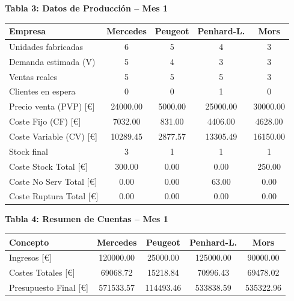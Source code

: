 \documentclass{standalone}
\begin{document}
	\vspace{4em} %
	
	\begin{minipage}{1.08\linewidth}
		\centering
		
		\textbf{Tabla 3: Datos de Producción – Mes 1}\\[0.5em]
		\begin{tabular}{@{}l
				S[table-format=2.0]
				S[table-format=2.0]
				S[table-format=2.0]
				S[table-format=2.0]@{}}
			\toprule
			\textbf{Empresa} & \textbf{Mercedes} & \textbf{Peugeot} & \textbf{Penhard-L.} & \textbf{Mors} \\
			\midrule
			Unidades fabricadas & 6 & 5 & 4 & 3 \\
			Demanda estimada (V) & 5 & 4 & 3 & 3 \\
			Ventas reales & 5 & 5 & 5 & 3 \\
			Clientes en espera & 0 & 0 & 1 & 0 \\
			Precio venta (PVP) [\euro] & 24000.00 & 5000.00 & 25000.00 & 30000.00 \\
			Coste Fijo (CF) [\euro] & 7032.00 & 831.00 & 4406.00 & 4628.00 \\
			Coste Variable (CV) [\euro] & 10289.45 & 2877.57 & 13305.49 & 16150.00 \\
			Stock final & 3 & 1 & 1 & 1 \\
			Coste Stock Total [\euro] & 300.00 & 0.00 & 0.00 & 250.00 \\
			Coste No Serv Total [\euro] & 0.00 & 0.00 & 63.00 & 0.00 \\
			Coste Ruptura Total [\euro] & 0.00 & 0.00 & 0.00 & 0.00 \\
			\bottomrule
		\end{tabular}
		
		\vspace{2em} %
		
		\textbf{Tabla 4: Resumen de Cuentas – Mes 1}\\[0.5em]
		\begin{tabular}{@{}l
				S[table-format=7.2]
				S[table-format=7.2]
				S[table-format=7.2]
				S[table-format=7.2]@{}}
			\toprule
			\textbf{Concepto} & \textbf{Mercedes} & \textbf{Peugeot} & \textbf{Penhard-L.} & \textbf{Mors} \\
			\midrule
			Ingresos [\euro] & 120000.00 & 25000.00 & 125000.00 & 90000.00 \\
			Costes Totales [\euro] & 69068.72 & 15218.84 & 70996.43 & 69478.02 \\
			Presupuesto Final [\euro] & 571533.57 & 114493.46 & 533838.59 & 535322.96 \\
			\bottomrule
		\end{tabular}
		
	\end{minipage}
	
\end{document}

